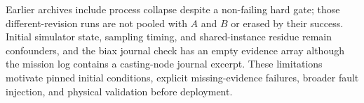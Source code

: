 Earlier archives include process collapse despite a non-failing hard gate;
those different-revision runs are not pooled with $A$ and $B$ or erased by
their success. Initial simulator state, sampling timing, and shared-instance
residue remain confounders, and the biax journal check has an empty evidence
array although the mission log contains a casting-node journal excerpt. These
limitations motivate pinned initial conditions, explicit missing-evidence
failures, broader fault injection, and physical validation before deployment.
